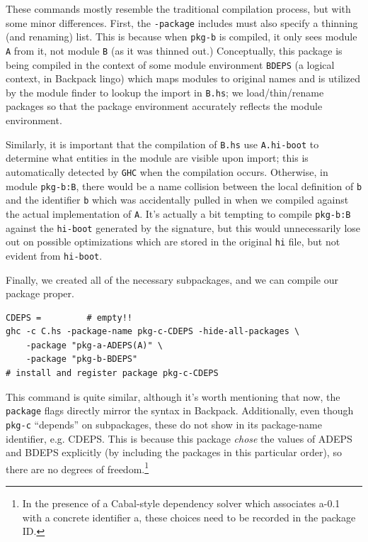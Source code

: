 \documentclass{article}
\begin{document}
These commands mostly resemble the traditional compilation process, but
with some minor differences.  First, the \verb|-package| includes must
also specify a thinning (and renaming) list.  This is because when
\verb|pkg-b| is compiled, it only sees module \verb|A| from it, not
module \verb|B| (as it was thinned out.)  Conceptually, this package is
being compiled in the context of some module environment \verb|BDEPS| (a
logical context, in Backpack lingo) which maps modules to original names
and is utilized by the module finder to lookup the import in
\verb|B.hs|; we load/thin/rename packages so that the package
environment accurately reflects the module environment.

Similarly, it is important that the compilation of \verb|B.hs| use \verb|A.hi-boot|
to determine what entities in the module are visible upon import; this is
automatically detected by \verb|GHC| when the compilation occurs.  Otherwise,
in module \verb|pkg-b:B|, there would be a name collision between the local
definition of \verb|b| and the identifier \verb|b| which was
accidentally pulled in when we compiled against the actual implementation of
\verb|A|.  It's actually a bit tempting to compile \verb|pkg-b:B| against the
\verb|hi-boot| generated by the signature, but this would unnecessarily
lose out on possible optimizations which are stored in the original \verb|hi|
file, but not evident from \verb|hi-boot|.

Finally, we created all of the necessary subpackages, and we can compile
our package proper.

\begin{verbatim}
CDEPS =         # empty!!
ghc -c C.hs -package-name pkg-c-CDEPS -hide-all-packages \
    -package "pkg-a-ADEPS(A)" \
    -package "pkg-b-BDEPS"
# install and register package pkg-c-CDEPS
\end{verbatim}

This command is quite similar, although it's worth mentioning that now,
the \verb|package| flags directly mirror the syntax in Backpack.
Additionally, even though \verb|pkg-c| ``depends'' on subpackages, these
do not show in its package-name identifier, e.g. CDEPS\@.  This is
because this package \emph{chose} the values of ADEPS and BDEPS
explicitly (by including the packages in this particular order), so
there are no degrees of freedom.\footnote{In the presence of a
    Cabal-style dependency solver which associates a-0.1 with a concrete
identifier a, these choices need to be recorded in the package ID.}
\end{document}

